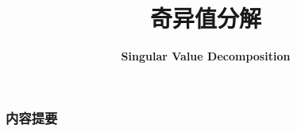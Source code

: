 



\title[SVD]{\LARGE \bfseries 奇异值分解} %
\author[] %
{\Large \bfseries Singular Value Decomposition}
\date{}






\begin{frame}

\titlepage %

\end{frame}


\begin{frame}
\frametitle{内容提要} %
\tableofcontents %
\end{frame}


